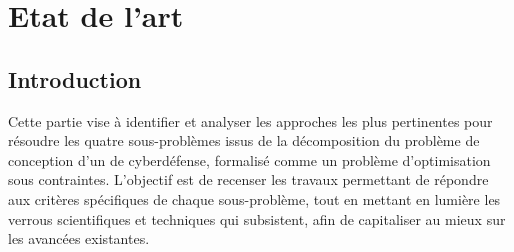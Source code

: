 \clearpage
\thispagestyle{empty}
\null
\newpage

\cleardoublepage
{}
\part{Etat de l'art}
\label{part:etat_art}

\clearpage
\thispagestyle{empty}
\null
\newpage


\chapter*{Introduction}

\noindent
Cette partie vise à identifier et analyser les approches les plus pertinentes pour résoudre les quatre sous-problèmes issus de la décomposition du problème de conception d’un  de cyberdéfense, formalisé comme un problème d’optimisation sous contraintes. L’objectif est de recenser les travaux permettant de répondre aux critères spécifiques de chaque sous-problème, tout en mettant en lumière les verrous scientifiques et techniques qui subsistent, afin de capitaliser au mieux sur les avancées existantes.

